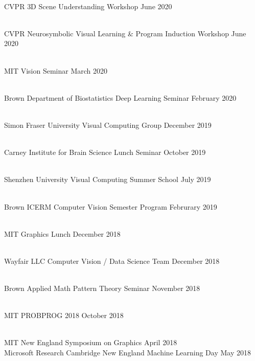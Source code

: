 \documentclass[line,margin]{res}
\begin{document}
\begin{resume}
\\
\talk
	{CVPR}
	{3D Scene Understanding Workshop}
	{June 2020}

\\
\talk
	{CVPR}
	{Neurosymbolic Visual Learning \& Program Induction Workshop}
	{June 2020}

\\
\talk
	{MIT}
	{Vision Seminar}
	{March 2020}

\\
\talk
	{Brown Department of Biostatistics}
	{Deep Learning Seminar}
	{February 2020}

\\
\talk
	{Simon Fraser University}
	{Visual Computing Group}
	{December 2019}

\\
\talk
	{Carney Institute for Brain Science}
	{Lunch Seminar}
	{October 2019}

\\
\talk
	{Shenzhen University}
	{Visual Computing Summer School}
	{July 2019}

\\
\talk
	{Brown ICERM}
	{Computer Vision Semester Program}
	{Februrary 2019}

\\
\talk
	{MIT}
	{Graphics Lunch}
	{December 2018}

\\
\talk
	{Wayfair LLC}
	{Computer Vision / Data Science Team}
	{December 2018}

\\
\talk
	{Brown Applied Math}
	{Pattern Theory Seminar}
	{November 2018}

\\
\talk
	{MIT}
	{PROBPROG 2018}
	{October 2018}

\\
\talk
	{MIT}
	{New England Symposium on Graphics}
	{April 2018}\\
\talk
	{Microsoft Research Cambridge}
	{New England Machine Learning Day}
	{May 2018}


\end{resume}
\end{document}
